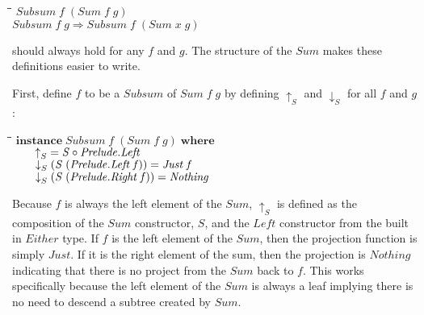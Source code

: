 \documentclass[11pt]{article}
\newlength{\lwidth}\setlength{\lwidth}{4.5cm}
\newlength{\cwidth}\setlength{\cwidth}{8mm} %
\newcommand{\Conid}[1]{\mathit{#1}}
\newcommand{\Varid}[1]{\mathit{#1}}
\begin{document}
\begin{tabbing}
\qquad\=\hspace{\lwidth}\=\hspace{\cwidth}\=\+\kill
${\Conid{Subsum}\;\Varid{f}\;(\Conid{Sum}\;\Varid{f}\;\Varid{g})}$\\
${\Conid{Subsum}\;\Varid{f}\;\Varid{g}\Rightarrow \Conid{Subsum}\;\Varid{f}\;(\Conid{Sum}\;\Varid{x}\;\Varid{g})}$
\end{tabbing}
should always hold for any \ensuremath{\Varid{f}} and \ensuremath{\Varid{g}}.  The structure of the \ensuremath{\Conid{Sum}}
makes these definitions easier to write.

First, define \ensuremath{\Varid{f}} to be a \ensuremath{\Conid{Subsum}} of \ensuremath{\Conid{Sum}\;\Varid{f}\;\Varid{g}} by defining \ensuremath{\Varid{\uparrow}_{S}} and
\ensuremath{\Varid{\downarrow}_{S}} for all \ensuremath{\Varid{f}} and \ensuremath{\Varid{g}}:

\begin{tabbing}
\qquad\=\hspace{\lwidth}\=\hspace{\cwidth}\=\+\kill
${\mathbf{instance}\;\Conid{Subsum}\;\Varid{f}\;(\Conid{Sum}\;\Varid{f}\;\Varid{g})\;\mathbf{where}}$\\
${\hskip2.00em\relax\Varid{\uparrow}_{S}\mathrel{=}\Conid{S}\mathbin{\circ}\Conid{\Conid{Prelude}.Left}}$\\
${\hskip2.00em\relax\Varid{\downarrow}_{S}\;(\Conid{S}\;(\Conid{\Conid{Prelude}.Left}\;\Varid{f}))\mathrel{=}\Conid{Just}\;\Varid{f}}$\\
${\hskip2.00em\relax\Varid{\downarrow}_{S}\;(\Conid{S}\;(\Conid{\Conid{Prelude}.Right}\;\Varid{f}))\mathrel{=}\Conid{Nothing}}$
\end{tabbing}
Because \ensuremath{\Varid{f}} is always the left element of the \ensuremath{\Conid{Sum}}, \ensuremath{\Varid{\uparrow}_{S}} is defined
as the composition of the \ensuremath{\Conid{Sum}} constructor, \ensuremath{\Conid{S}}, and the \ensuremath{\Conid{Left}}
constructor from the built in \ensuremath{\Conid{Either}} type.  If \ensuremath{\Varid{f}} is the left
element of the \ensuremath{\Conid{Sum}}, then the projection function is simply \ensuremath{\Conid{Just}}.
If it is the right element of the sum, then the projection is
\ensuremath{\Conid{Nothing}} indicating that there is no project from the \ensuremath{\Conid{Sum}} back to
\ensuremath{\Varid{f}}.  This works specifically because the left element of the \ensuremath{\Conid{Sum}} is
always a leaf implying there is no need to descend a subtree created
by \ensuremath{\Conid{Sum}}.
\end{document}
